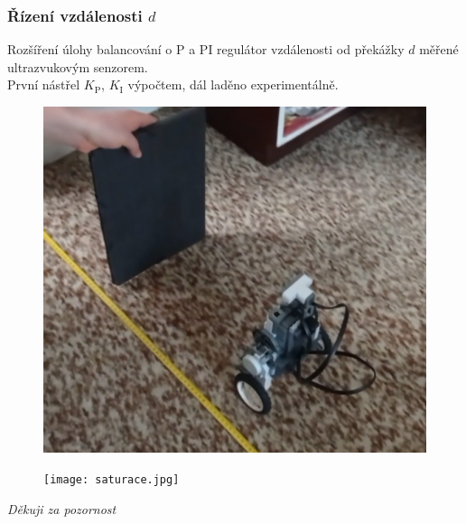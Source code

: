 \documentclass{beamer}
\begin{document}
    \begin{frame}


        \frametitle{Řízení vzdálenosti $d$}

        Rozšíření úlohy balancování o P a PI regulátor vzdálenosti od překážky $d$ měřené ultrazvukovým senzorem. \\
        První nástřel $K_\text{P}$, $K_\text{I}$ výpočtem, dál laděno experimentálně.  
        
        \begin{figure}[htbp]
            \centerline{\includegraphics[width=0.6\linewidth]{proporcionalni_d_experiment.png}}
            \label{fig:porovnani_skok}        
        \end{figure}
    
    \end{frame}

   \begin{frame}
   \begin{figure}
    \texttt{[image: saturace.jpg]}
       
   \end{figure}
   \centering
   \textit{Děkuji za pozornost}
   
   \end{frame}

\end{document}

